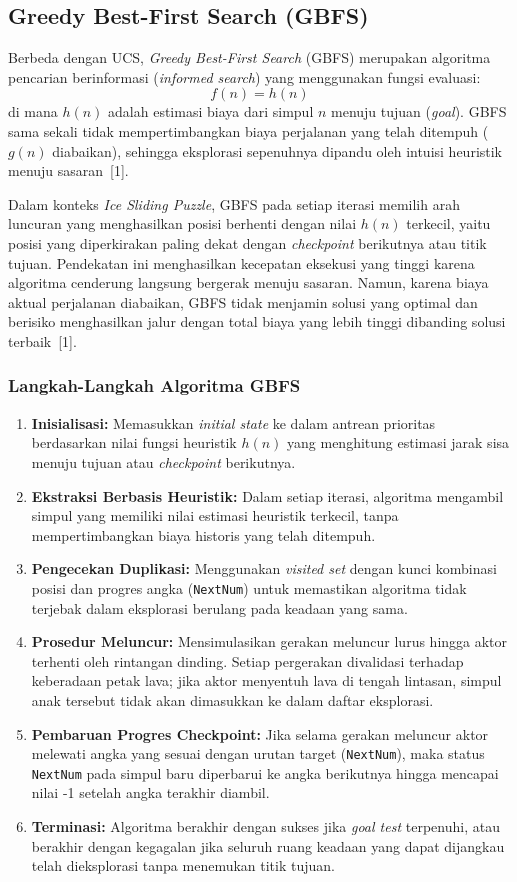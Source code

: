 \documentclass[12pt,a4paper]{article}
\begin{document}
\subsection{Greedy Best-First Search (GBFS)}
Berbeda dengan UCS, \textit{Greedy Best-First Search} (GBFS) merupakan algoritma pencarian berinformasi (\textit{informed search}) yang menggunakan fungsi evaluasi:
\[
  f(n) = h(n)
\]
di mana $h(n)$ adalah estimasi biaya dari simpul $n$ menuju tujuan (\textit{goal}). GBFS sama sekali tidak mempertimbangkan biaya perjalanan yang telah ditempuh ($g(n)$ diabaikan), sehingga eksplorasi sepenuhnya dipandu oleh intuisi heuristik menuju sasaran~[1].

Dalam konteks \textit{Ice Sliding Puzzle}, GBFS pada setiap iterasi memilih arah luncuran yang menghasilkan posisi berhenti dengan nilai $h(n)$ terkecil, yaitu posisi yang diperkirakan paling dekat dengan \textit{checkpoint} berikutnya atau titik tujuan. Pendekatan ini menghasilkan kecepatan eksekusi yang tinggi karena algoritma cenderung langsung bergerak menuju sasaran. Namun, karena biaya aktual perjalanan diabaikan, GBFS tidak menjamin solusi yang optimal dan berisiko menghasilkan jalur dengan total biaya yang lebih tinggi dibanding solusi terbaik~[1].

\subsubsection{Langkah-Langkah Algoritma GBFS}
\begin{enumerate}
\item \textbf{Inisialisasi:} Memasukkan \textit{initial state} ke dalam antrean prioritas berdasarkan nilai fungsi heuristik $h(n)$ yang menghitung estimasi jarak sisa menuju tujuan atau \textit{checkpoint} berikutnya.
\item \textbf{Ekstraksi Berbasis Heuristik:} Dalam setiap iterasi, algoritma mengambil simpul yang memiliki nilai estimasi heuristik terkecil, tanpa mempertimbangkan biaya historis yang telah ditempuh.
\item \textbf{Pengecekan Duplikasi:} Menggunakan \textit{visited set} dengan kunci kombinasi posisi dan progres angka (\texttt{NextNum}) untuk memastikan algoritma tidak terjebak dalam eksplorasi berulang pada keadaan yang sama.
\item \textbf{Prosedur Meluncur:} Mensimulasikan gerakan meluncur lurus hingga aktor terhenti oleh rintangan dinding. Setiap pergerakan divalidasi terhadap keberadaan petak lava; jika aktor menyentuh lava di tengah lintasan, simpul anak tersebut tidak akan dimasukkan ke dalam daftar eksplorasi.
\item \textbf{Pembaruan Progres Checkpoint:} Jika selama gerakan meluncur aktor melewati angka yang sesuai dengan urutan target (\texttt{NextNum}), maka status \texttt{NextNum} pada simpul baru diperbarui ke angka berikutnya hingga mencapai nilai -1 setelah angka terakhir diambil.
\item \textbf{Terminasi:} Algoritma berakhir dengan sukses jika \textit{goal test} terpenuhi, atau berakhir dengan kegagalan jika seluruh ruang keadaan yang dapat dijangkau telah dieksplorasi tanpa menemukan titik tujuan.
\end{enumerate}
\end{document}

